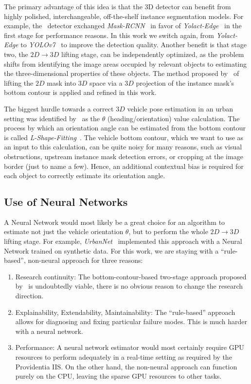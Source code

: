 The primary advantage of this idea is that the 3D detector can benefit from highly polished, interchangeable, off-the-shelf instance segmentation models.
For example, the~\cite{leonthesis} detector exchanged \textit{Mask-RCNN}~\cite{he2017mask} in favor of \textit{Yolact-Edge}~\cite{liu2021yolactedge} in the first stage for performance reasons.
In this work we switch again, from \textit{Yolact-Edge} to \textit{YOLOv7}~\cite{wang2022yolov7} to improve the detection quality.
Another benefit is that stage two, the $2D \rightarrow 3D$ lifting stage, can be independently optimized, as the problem shifts from identifying the image areas occupied by relevant objects to estimating the three-dimensional properties of these objects.
The method proposed by~\cite{leonthesis} of lifting the $2D$ mask into $3D$ space via a $3D$ projection of the instance mask's bottom contour is applied and refined in this work.

The biggest hurdle towards a correct $3D$ vehicle pose estimation in an urban setting was identified by~\cite{leonthesis} as the $\theta$ (heading/orientation) value calculation.
The process by which an orientation angle can be estimated from the bottom contour is called \textit{L-Shape-Fitting}~\cite{zhang2017efficient}.
The vehicle bottom contour, which we want to use as an input to this calculation, can be quite noisy for many reasons, such as visual obstructions, upstream instance mask detection errors, or cropping at the image border (just to name a few).
Hence, an additional contextual bias is required for each object to correctly estimate its orientation angle.

\subsection{Use of Neural Networks}
\label{subsec:neural}

A Neural Network would most likely be a great choice for an algorithm to estimate not just the vehicle orientation $\theta$, but to perform the whole $2D \rightarrow 3D$ lifting stage.
For example, \textit{UrbanNet}~\cite{carrillo2021urbannet} implemented this approach with a Neural Network trained on synthetic data.
For this work, we are staying with a \enquote{rule-based}, non-neural approach for three reasons:

\begin{enumerate}
    \item Research continuity: The bottom-contour-based two-stage approach proposed by~\cite{leonthesis} is undoubtedly viable, there is no obvious reason to change the research direction.
    \item Explainability, Extendability, Maintainability: The \enquote{rule-based} approach allows for diagnosing and fixing particular failure modes.
    This is much harder with a neural network.
    \item Performance: A neural network estimator would most certainly require GPU resources to perform adequately in a real-time setting as required by the Providentia IIS. On the other hand, the non-neural approach can function purely on the CPU, leaving the sparse GPU resources to other tasks.
\end{enumerate}


